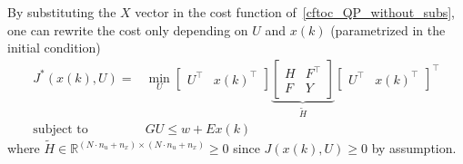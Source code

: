 By substituting the $X$ vector in the cost function of~\ref{cftoc_QP_without_subs}, one can rewrite the cost only depending on $U$ and $x(k)$ (parametrized in the initial condition)
\begin{align*}
    J^*(x(k), U)=          & \min_{U}\begin{bmatrix}
                                         U^\top & {x(k)}^\top
                                     \end{bmatrix}
    \underbrace{\begin{bmatrix}
                        H & F^\top \\
                        F & Y
                    \end{bmatrix}}_{\tilde{H}}
    {\begin{bmatrix}
         U^\top & {x(k)}^\top
     \end{bmatrix}}^\top                                 \\
    \text{subject to}\quad & GU \leq w + Ex(k)
\end{align*}
where $\tilde{H}\in \mathbb{R}^{(N\cdot n_u + n_x)\times (N\cdot n_u + n_x)}\geq 0$ since $J(x(k),U) \geq 0$ by assumption.

\newpar{}


